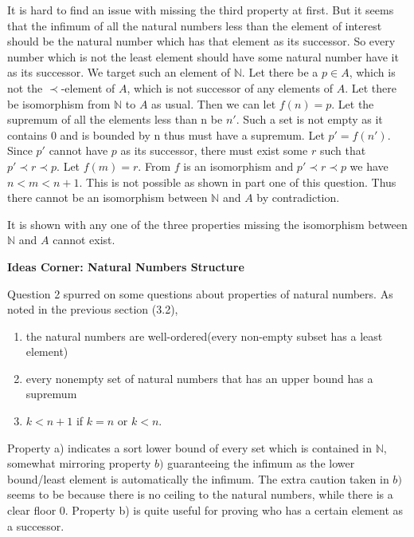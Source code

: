 \documentclass{article}
\begin{document}
\begin{enumerate}
\medskip

It is hard to find an issue with missing the third property at first. But it seems that the infimum of all the natural numbers less than the element of interest should be the natural number which has that element as its successor. So every number which is not the least element should have some natural number have it as its successor. We target such an element of $\mathbb{N}$. Let there be a $p \in A$, which is not the $\prec$-element of $A$, which is not successor of any elements of $A$. Let there be isomorphism from $\mathbb{N}$ to $A$ as usual. Then we can let $f(n) = p$. Let the supremum of all the elements less than n be $n'$. Such a set is not empty as it contains 0 and is bounded by n thus must have a supremum. Let $p' = f(n')$. Since $p'$ cannot have $p$ as its successor, there must exist some $r$ such that $p' \prec r \prec p$. Let $f(m) = r$. From $f$ is an isomorphism and $p' \prec r \prec p$ we have $n < m < n + 1$. This is not possible as shown in part one of this question. Thus there cannot be an isomorphism between $\mathbb{N}$ and $A$ by contradiction.

\medskip

It is shown with any one of the three properties missing the isomorphism between $\mathbb{N}$ and $A$ cannot exist.

\medskip
\textbf{Ideas Corner: Natural Numbers Structure}
\medskip

Question 2 spurred on some questions about properties of natural numbers. As noted in the previous section (3.2),

\begin{enumerate}
 \item the natural numbers are well-ordered(every non-empty subset has a least element)
 \item every nonempty set of natural numbers that has an upper bound has a supremum
 \item $k < n + 1$ if $k = n$ or $k < n$.
 \end{enumerate}

\medskip
Property a) indicates a sort lower bound of every set which is contained in $\mathbb{N}$, somewhat mirroring property $b)$ guaranteeing the infimum as the lower bound/least element is automatically the infimum. The extra caution taken in $b)$ seems to be because there is no ceiling to the natural numbers, while there is a clear floor $0$. Property b) is quite useful for proving who has a certain element as a successor.


\end{enumerate}
\end{document}
